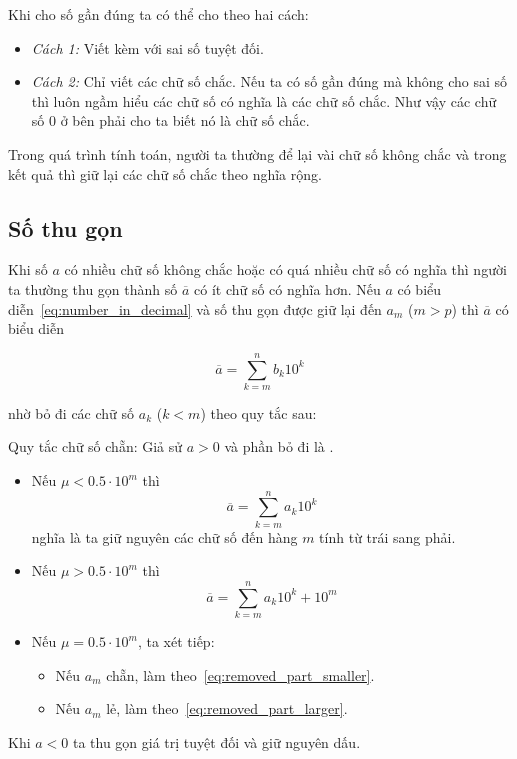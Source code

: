 \documentclass[../../Lectures.tex]{subfiles}
\begin{document}
Khi cho số gần đúng ta có thể cho theo hai cách:

\begin{itemize}
    \item \emph{Cách 1:} Viết kèm với sai số tuyệt đối.
    \item \emph{Cách 2:} Chỉ viết các chữ số chắc. Nếu ta có số gần đúng mà
        không cho sai số thì luôn ngầm hiểu các chữ số có nghĩa là các chữ số
        chắc. Như vậy các chữ số 0 ở bên phải cho ta biết nó là chữ số chắc.
\end{itemize}

Trong quá trình tính toán, người ta thường để lại vài chữ số không chắc và trong
kết quả thì giữ lại các chữ số chắc theo nghĩa rộng.

\subsection{Số thu gọn}

Khi số \(a\) có nhiều chữ số không chắc hoặc có quá nhiều chữ số có nghĩa thì
người ta thường thu gọn thành số \(\overline{a}\) có ít chữ số có nghĩa hơn. Nếu
\(a\) có biểu diễn~\ref{eq:number_in_decimal} và số thu gọn được giữ lại đến
\(a_m\) (\(m > p\)) thì \(\overline{a}\) có biểu diễn

\begin{equation}
    \overline{a} = \sum_{k=m}^{n} b_k 10^k
\end{equation}

nhờ bỏ đi các chữ số \(a_k\) (\(k < m\)) theo quy tắc sau:

\begin{rule_of_thumb}
Quy tắc chữ số chẵn: Giả sử \(a > 0\) và phần bỏ đi là \mu.

\begin{itemize}
    \item Nếu \(\mu < \num{0.5} \cdot 10^m\) thì
        \begin{equation}\label{eq:removed_part_smaller}
            \overline{a} = \sum_{k=m}^{n} a_k 10^k
        \end{equation}
        nghĩa là ta giữ nguyên các chữ số đến hàng \(m\) tính từ trái sang phải.
    \item Nếu \(\mu > \num{0.5} \cdot 10^m\) thì
        \begin{equation}\label{eq:removed_part_larger}
            \overline{a} = \sum_{k=m}^{n} a_k 10^k + 10^m
        \end{equation}
    \item Nếu \(\mu = \num{0.5} \cdot 10^m\), ta xét tiếp:
        \begin{itemize}
            \item Nếu \(a_m\) chẵn, làm theo~\ref{eq:removed_part_smaller}.
            \item Nếu \(a_m\) lẻ, làm theo~\ref{eq:removed_part_larger}.
        \end{itemize}
\end{itemize}

Khi \(a < 0\) ta thu gọn giá trị tuyệt đối và giữ nguyên dấu.
\end{rule_of_thumb}
\end{document}
